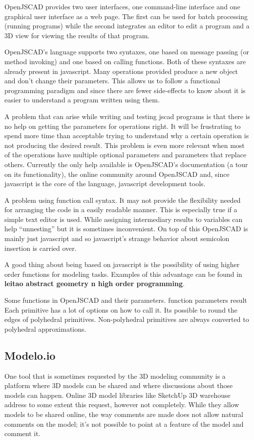 \documentclass{./llncs2e/llncs}
\begin{document}
	OpenJSCAD provides two user interfaces, one command-line interface and one graphical user interface as a web page.
	The first can be used for batch processing (running programs) while the second integrates an editor to edit a program and a 3D view for viewing the results of that program.

	OpenJSCAD's language supports two syntaxes, one based on message passing (or method invoking) and one based on calling functions.
	Both of these syntaxes are already present in javascript. 
	Many operations provided produce a new object and don't change their parameters. 
	This allows us to follow a functional programming paradigm and since there are fewer side-effects to know about it is easier to understand a program written using them.

	A problem that can arise while writing and testing jscad programs is that there is no help on getting the parameters for operations right.
	It will be frustrating to spend more time than acceptable trying to understand why a certain operation is not producing the desired result. 
	This problem is even more relevant when most of the operations have multiple optional parameters and parameters that replace others. 
	Currently the only help available is OpenJSCAD's documentation (a tour on its functionality), the online community around OpenJSCAD and, since javascript is the core of the language, javascript development tools.

	A problem using function call syntax.
	It may not provide the flexibility needed for arranging the code in a easily readable manner. 
	This is especially true if a simple text editor is used. 
	While assigning intermediary results to variables can help ``unnesting'' but it is sometimes inconvenient. 
	On top of this OpenJSCAD is mainly just javascript and so javascript's strange behavior about semicolon insertion is carried over. 

	A good thing about being based on javascript is the possibility of using higher order functions for modeling tasks.
	Examples of this advantage can be found in \textbf{leitao abstract geometry n high order programming}.

	Some functions in OpenJSCAD and their parameters.
	function parameters result 
	Each primitive has a lot of options on how to call it.
	Its possible to round the edges of polyhedral primitives.
	Non-polyhedral primitives are always converted to polyhedral approximations.

\subsection{Modelo.io}
	One tool that is sometimes requested by the 3D modeling community is a platform where 3D models can be shared and where discussions about those models can happen.
	Online 3D model libraries like SketchUp 3D warehouse address to some extent this request, however not completely. 
	While they allow models to be shared online, the way comments are made does not allow natural comments on the model; it's not possible to point at a feature of the model and comment it.
\end{document}
